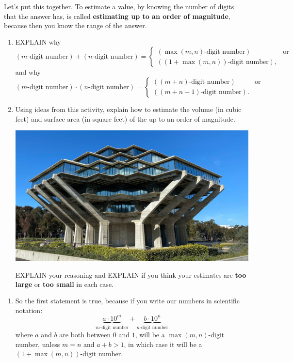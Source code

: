 \documentclass[nooutcomes,noauthor]{ximera}
\begin{document}
\begin{question}
  Let's put this together. To estimate a value, by knowing the number
  of digits that the answer has, is called \textbf{estimating up to an
    order of magnitude}, because then you know the range of the
  answer.
  \begin{enumerate}
  \item EXPLAIN why 
    \[
    (\text{$m$-digit number}) + (\text{$n$-digit number}) =
    \begin{cases}
      (\text{$\max(m,n)$-digit number}) & \text{or}\\
      (\text{$(1+\max(m,n))$-digit number}),
    \end{cases}
    \]
    and why
    \[
    (\text{$m$-digit number}) \cdot (\text{$n$-digit number}) = \begin{cases}
      (\text{$(m+n)$-digit number}) & \text{or}\\
      (\text{$(m+n-1)$-digit number}).
    \end{cases}
    \]
  \item Using ideas from this activity, explain how to estimate the
    volume (in cubic feet) and surface area (in square feet) of the  up to an
    order of magnitude.

  \begin{center}
    \includegraphics[width=.4\textwidth]{geisel.jpg} 
  \end{center}

    EXPLAIN your reasoning and EXPLAIN if you
    think your estimates are \textbf{too large} or \textbf{too small}
    in each case.
  \end{enumerate}
  \begin{freeResponse}
    \begin{enumerate}
    \item So the first statement is true, because if you write our
      numbers in scientific notation:
      \[
      \underbrace{a\cdot 10^m}_{\text{$m$-digit number}} + \underbrace{b\cdot 10^n}_{\text{$n$-digit number}}
      \]
      where $a$ and $b$ are both between $0$ and $1$, will be a
      $\max(m,n)$-digit number, unless $m=n$ and $a+b>1$, in which case it will be a $(1+\max(m,n))$-digit number.


\end{enumerate}
\end{freeResponse}
\end{question}
\end{document}
